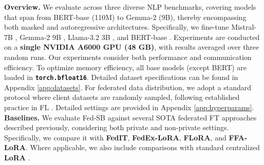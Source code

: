 \quad \textbf{Overview.}
We evaluate across three diverse NLP benchmarks, covering models that span from BERT-base (110M) to Gemma-2 (9B), thereby encompassing both masked and autoregressive architectures. 
Specifically, we fine-tune Mistral-7B \citep{mistral7b}, Gemma-2 9B \citep{gemma2}, Llama-3.2 3B \citep{llama3}, and BERT-base \citep{devlin2018bert}. 
Experiments are conducted on a \textbf{single NVIDIA A6000 GPU (48 GB)}, with results averaged over three random runs. 
Our experiments consider both performance and communication efficiency.
To optimize memory efficiency, all base models (except BERT) are loaded in \texttt{\textbf{torch.bfloat16}}. 
Detailed dataset specifications can be found in Appendix \ref{app:datasets}. 
For federated data distribution, we adopt a standard protocol where client datasets are randomly sampled, following established practice in FL \citep{sun2024improving, he2020fedml, lai2022fedscale}.
Detailed settings are provided in Appendix \ref{app:hyperparams}. 
\\

\textbf{Baselines.}
We evaluate Fed-SB against several SOTA federated FT approaches described previously, considering both private and non-private settings. 
Specifically, we compare it with \textbf{FedIT}, \textbf{FedEx-LoRA}, \textbf{FLoRA}, and \textbf{FFA-LoRA}. 
Where applicable, we also include comparisons with standard centralized \textbf{LoRA} \citep{lora}.


